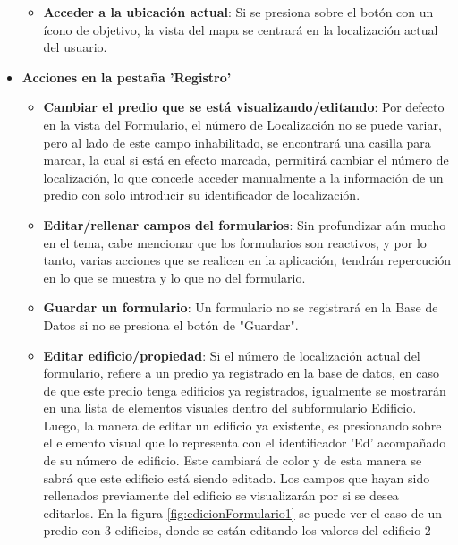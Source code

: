 \begin{itemize}
\begin{itemize}
              \item \textbf{Acceder a la ubicación actual}: Si se presiona sobre el botón con un ícono de objetivo, la vista del mapa se centrará en
                    la localización actual del usuario.
          \end{itemize}
    \item \textbf{Acciones en la pestaña 'Registro'}
          \begin{itemize}
              \item \textbf{Cambiar el predio que se está visualizando/editando}: Por defecto en la vista del Formulario, el número de Localización no se puede variar,
                    pero al lado de este campo inhabilitado, se encontrará una casilla para marcar, la cual si está en efecto marcada, permitirá cambiar el número de
                    localización, lo que concede acceder manualmente a la información de un predio con solo introducir su identificador de localización.
              \item \textbf{Editar/rellenar campos del formularios}: Sin profundizar aún mucho en el tema, cabe mencionar que los formularios son reactivos, y por lo tanto,
                    varias acciones que se realicen en la aplicación, tendrán repercución en lo que se muestra y lo que no del formulario.
              \item \textbf{Guardar un formulario}: Un formulario no se registrará en la Base de Datos si no se presiona el botón de "Guardar".
              \item \textbf{Editar edificio/propiedad}: Si el número de localización actual del formulario, refiere a un predio ya registrado en la base de datos, en caso de
                    que este predio tenga edificios ya registrados, igualmente se mostrarán en una lista de elementos visuales dentro del subformulario Edificio. Luego, la manera
                    de editar un edificio ya existente, es presionando sobre el elemento visual que lo representa con el identificador 'Ed' acompañado de su número de edificio. Este cambiará
                    de color y de esta manera se sabrá que este edificio está siendo editado. Los campos que hayan sido rellenados previamente del edificio se visualizarán por si se
                    desea editarlos. En la figura \ref{fig:edicionFormulario1} se puede ver el caso de un predio con 3 edificios, donde se están editando los valores del edificio 2\\
                    \begin{figure}[h]
                        \centering

\end{figure}
\end{itemize}
\end{itemize}
